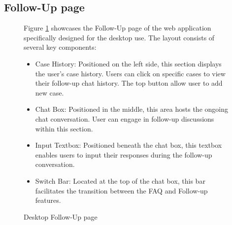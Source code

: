 \documentclass[12pt,oneside,openright,a4paper]{cpe-english-project}
\begin{document}
    \subsection{Follow-Up page}
      \begin{figure}[H]
        \centering
        \caption{Desktop Follow-Up page}\label{fig:Desk_Follow}
        \begin{justify}
          \qquad Figure \ref{fig:Desk_Follow} showcases the Follow-Up page of the web application specifically designed for the desktop use. The layout consists of several key components: \par
          \begin{itemize}
            \item Case History: Positioned on the left side, this section displays the user’s case history. Users can click on specific cases to view their follow-up chat history. The top button allow user to add new case.
            \item Chat Box: Positioned in the middle, this area hosts the ongoing chat conversation. User can engage in follow-up discussions within this section. 
            \item Input Textbox: Positioned beneath the chat box, this textbox enables users to input their responses during the follow-up conversation. 
            \item Switch Bar: Located at the top of the chat box, this bar facilitates the transition between the FAQ and Follow-up features.
          \end{itemize}
        \end{justify}
      \end{figure}
\end{document}
